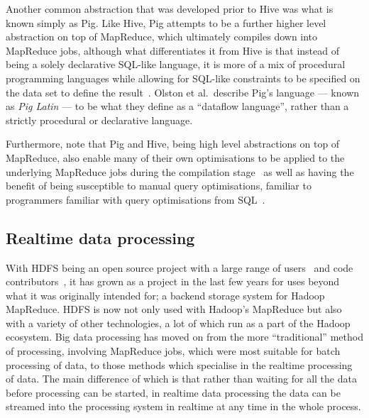 \documentclass[a4paper,11pt]{article}
\begin{document}
Another common abstraction that was developed prior to Hive was what is known simply as Pig. Like Hive, Pig attempts to
be a further higher level abstraction on top of MapReduce, which ultimately compiles down into MapReduce jobs, although
what differentiates it from Hive is that instead of being a solely declarative SQL-like language, it is more of a mix of
procedural programming languages while allowing for SQL-like constraints to be specified on the data set to define the
result~\cite{olston2008pig}. Olston et al.\ describe Pig's language --- known as \emph{Pig Latin} --- to be what they
define as a ``dataflow language'', rather than a strictly procedural or declarative language.

Furthermore, note that Pig and Hive, being high level abstractions on top of MapReduce, also enable many of their own
optimisations to be applied to the underlying MapReduce jobs during the compilation
stage~\cite{gates2009building,thusoo2010hive} as well as having the benefit of being susceptible to manual query
optimisations, familiar to programmers familiar with query optimisations from SQL~\cite{gruenheid2011query}.




\subsection{Realtime data processing} %
\label{sub:realtime_data_processing}

With HDFS being an open source project with a large range of users~\cite{hadoop_users} and code
contributors~\cite{hadoop_committers}, it has grown as a project in the last few years for uses beyond what it was
originally intended for; a backend storage system for Hadoop MapReduce. HDFS is now not only used with Hadoop's
MapReduce but also with a variety of other technologies, a lot of which run as a part of the Hadoop ecosystem.
Big data processing has moved on from the more ``traditional'' method of processing, involving MapReduce jobs, which
were most suitable for batch processing of data, to those methods which specialise in the realtime processing of data.
The main difference of which is that rather than waiting for all the data before processing can be started, in realtime
data processing the data can be streamed into the processing system in realtime at any time in the whole process.
\end{document}
